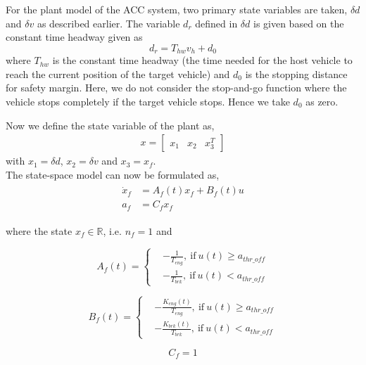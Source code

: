 For the plant model of the ACC system, two primary state variables are taken, $\delta d$ and $\delta v$ as described earlier. The variable $d_r$ defined in $\delta d$ is given based on the constant time headway given as
\[d_r = T_{hw}v_h + d_0\]
where $T_{hw}$ is the constant time headway (the time needed for the host vehicle to reach the current position of the target vehicle) and $d_0$ is the stopping distance for safety margin. Here, we do not consider the stop-and-go function where the vehicle stops completely if the target vehicle stops. Hence we take $d_0$ as zero.

Now we define the state variable of the plant as,
\begin{align*}
    x = \begin{bmatrix}
    x_1 & x_2 & x_3^T
    \end{bmatrix}
\end{align*}
with $x_1 = \delta d$, $x_2 = \delta v$ and $x_3 = x_f$.\\
The state-space model can now be formulated as,
\begin{gather}
\begin{aligned}
\dot{x}_f &= A_f(t)x_f + B_f(t)u\\
a_f &= C_f x_f
\end{aligned}
\end{gather}

where the state $x_f \in \mathbb{R}$, i.e. $n_f=1$ and

\begin{equation}
A_f(t) =
\begin{cases}
& -\frac{1}{T_{eng}},\: \text{if}\: u(t) \geq a_{thr\_off}\\
& -\frac{1}{T_{brk}},\: \text{if}\: u(t) < a_{thr\_off}
\end{cases}
\end{equation}

\begin{equation}
B_f(t) =
\begin{cases}
& -\frac{K_{eng}(t)}{T_{eng}},\: \text{if}\: u(t) \geq a_{thr\_off}\\
& -\frac{K_{brk}(t)}{T_{brk}},\: \text{if}\: u(t) < a_{thr\_off}
\end{cases}
\end{equation}

\[
C_f = 1
\]


